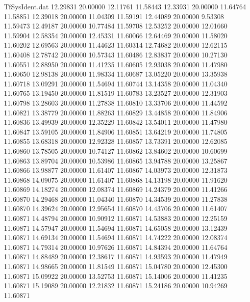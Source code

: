 \begin{filecontents}{TfSysIdent.dat}
  12.29831   20.00000   12.11761   11.58443
  12.33931   20.00000   11.64764   11.58851
  12.39018   20.00000   11.04309   11.59191
  12.44089   20.00000    9.53308   11.59473
  12.49187   20.00000   10.77484   11.59708
  12.53252   20.00000   12.01660   11.59904
  12.58354   20.00000   12.45331   11.60066
  12.64469   20.00000   11.58020   11.60202
  12.69563   20.00000   11.44623   11.60314
  12.74682   20.00000   12.62115   11.60408
  12.78742   20.00000   10.57343   11.60486
  12.83837   20.00000   10.27130   11.60551
  12.88950   20.00000   11.41235   11.60605
  12.93038   20.00000   11.47980   11.60650
  12.98138   20.00000   11.98334   11.60687
  13.05220   20.00000   13.35938   11.60718
  13.09291   20.00000   11.54694   11.60744
  13.14358   20.00000   11.04340   11.60765
  13.19450   20.00000   11.81519   11.60783
  13.23527   20.00000   12.31903   11.60798
  13.28603   20.00000   11.27838   11.60810
  13.33706   20.00000   11.44592   11.60821
  13.38779   20.00000   11.88263   11.60829
  13.44858   20.00000   11.84906   11.60836
  13.49939   20.00000   12.35229   11.60842
  13.54011   20.00000   11.47980   11.60847
  13.59105   20.00000   11.84906   11.60851
  13.64219   20.00000   11.74805   11.60855
  13.68318   20.00000   12.92328   11.60857
  13.73391   20.00000   12.62085   11.60860
  13.78505   20.00000   10.74127   11.60862
  13.84602   20.00000   10.60699   11.60863
  13.89704   20.00000   10.53986   11.60865
  13.94788   20.00000   13.25867   11.60866
  13.98877   20.00000   11.61407   11.60867
  14.03973   20.00000   12.31873   11.60868
  14.09075   20.00000   11.61407   11.60868
  14.13198   20.00000   11.91620   11.60869
  14.18274   20.00000   12.08374   11.60869
  14.24379   20.00000   11.41266   11.60870
  14.29468   20.00000   11.04340   11.60870
  14.34539   20.00000   11.27838   11.60870
  14.39624   20.00000   12.95654   11.60870
  14.43706   20.00000   11.61407   11.60871
  14.48794   20.00000   10.90912   11.60871
  14.53883   20.00000   12.25159   11.60871
  14.57947   20.00000   11.54694   11.60871
  14.65058   20.00000   13.12439   11.60871
  14.69134   20.00000   11.54694   11.60871
  14.74222   20.00000   12.08374   11.60871
  14.79314   20.00000   10.97626   11.60871
  14.84394   20.00000   11.64764   11.60871
  14.88489   20.00000   12.38617   11.60871
  14.93593   20.00000   11.47949   11.60871
  14.98665   20.00000   11.81549   11.60871
  15.04780   20.00000   12.45300   11.60871
  15.09922   20.00000   13.52753   11.60871
  15.14006   20.00000   11.41235   11.60871
  15.19089   20.00000   12.21832   11.60871
  15.24186   20.00000   10.94269   11.60871

\end{filecontents}
